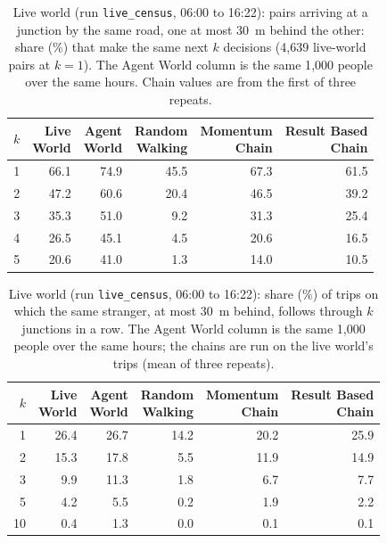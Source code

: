 \begin{table}[t]
\centering
\footnotesize
\setlength{\tabcolsep}{4pt}
\caption{Live world (run \texttt{live\_census}, 06:00 to 16:22): pairs arriving at a junction by the same road, one at most \SI{30}{\metre} behind the other: share (\%) that make the same next $k$ decisions (4{,}639 live-world pairs at $k = 1$). The Agent World column is the same 1{,}000 people over the same hours. Chain values are from the first of three repeats.}
\label{tab:live-pairs}
\begin{tabular}{@{}rrrrrr@{}}
\toprule
$k$ & \shortstack{Live\\World} & \shortstack{Agent\\World} & \shortstack{Random\\Walking} & \shortstack{Momentum\\Chain} & \shortstack{Result Based\\Chain} \\
\midrule
1 & 66.1 & 74.9 & 45.5 & 67.3 & 61.5 \\
2 & 47.2 & 60.6 & 20.4 & 46.5 & 39.2 \\
3 & 35.3 & 51.0 &  9.2 & 31.3 & 25.4 \\
4 & 26.5 & 45.1 &  4.5 & 20.6 & 16.5 \\
5 & 20.6 & 41.0 &  1.3 & 14.0 & 10.5 \\
\bottomrule
\end{tabular}
\end{table}

\begin{table}[t]
\centering
\footnotesize
\setlength{\tabcolsep}{4pt}
\caption{Live world (run \texttt{live\_census}, 06:00 to 16:22): share (\%) of trips on which the same stranger, at most \SI{30}{\metre} behind, follows through $k$ junctions in a row. The Agent World column is the same 1{,}000 people over the same hours; the chains are run on the live world's trips (mean of three repeats).}
\label{tab:live-following}
\begin{tabular}{@{}rrrrrr@{}}
\toprule
$k$ & \shortstack{Live\\World} & \shortstack{Agent\\World} & \shortstack{Random\\Walking} & \shortstack{Momentum\\Chain} & \shortstack{Result Based\\Chain} \\
\midrule
1 & 26.4 & 26.7 & 14.2 & 20.2 & 25.9 \\
2 & 15.3 & 17.8 &  5.5 & 11.9 & 14.9 \\
3 & 9.9 & 11.3 &  1.8 & 6.7 & 7.7 \\
5 & 4.2 & 5.5 &  0.2 & 1.9 & 2.2 \\
10 & 0.4 & 1.3 &  0.0 & 0.1 & 0.1 \\
\bottomrule
\end{tabular}
\end{table}
